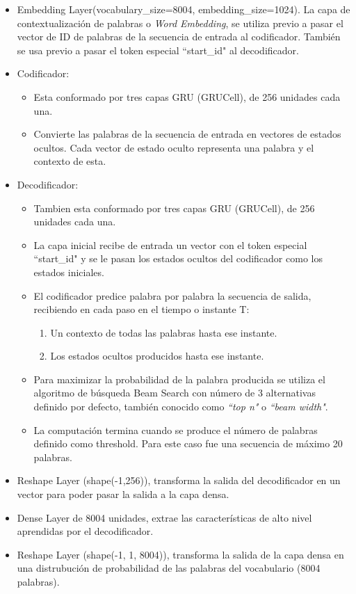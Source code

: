 \documentclass[12pt, letterpaper]{article}
\begin{document}
        \begin{itemize}
            \item Embedding Layer(vocabulary\_size=8004, embedding\_size=1024).
            La capa de contextualización de palabras o \emph{Word Embedding}, se utiliza previo a pasar el vector de ID de palabras de la secuencia de entrada al codificador. También se usa previo a pasar el token especial “start\_id" al decodificador.
            \item Codificador:
                \begin{itemize}
                    \item Esta conformado por tres capas GRU (GRUCell), de 256 unidades cada una.
                    \item Convierte las palabras de la secuencia de entrada en vectores de estados ocultos. Cada vector de estado oculto representa una palabra y el contexto de esta.
                \end{itemize}
            \item Decodificador:
                \begin{itemize}
                    \item Tambien esta conformado por tres capas GRU (GRUCell), de 256 unidades cada una.
                \item La capa inicial recibe de entrada un vector con el token especial “start\_id" y se le pasan los estados ocultos del codificador como los estados iniciales.
                \item El codificador predice palabra por palabra la secuencia de salida, recibiendo en cada paso en el tiempo o instante T:
                \begin{enumerate}
                    \item Un contexto de todas las palabras hasta ese instante.
                    \item Los estados ocultos producidos hasta ese instante.
                \end{enumerate}
                \item Para maximizar la probabilidad de la palabra producida se utiliza el algoritmo de búsqueda Beam Search con número de 3 alternativas definido por defecto, también conocido como \emph{“top n"} o \emph{“beam width"}.
                \item La computación termina cuando se produce el número de palabras definido como threshold. Para este caso fue una secuencia de máximo 20 palabras.
                \end{itemize}
            \item Reshape Layer (shape(-1,256)), transforma la salida del decodificador en un vector para poder pasar la salida a la capa densa.
            \item Dense Layer de 8004 unidades, extrae las características de alto nivel aprendidas por el decodificador.
            \item Reshape Layer (shape(-1, 1, 8004)), transforma la salida de la capa densa en una distrubución de probabilidad de las palabras del vocabulario (8004 palabras).
        \end{itemize}
        
\end{document}
